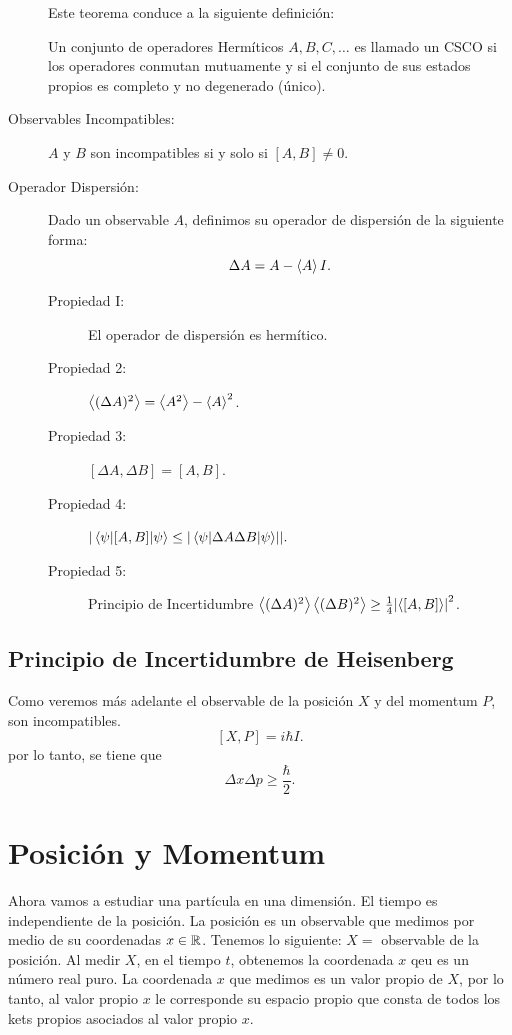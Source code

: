 \begin{description}
	Este teorema conduce a la siguiente definición:
	\begin{definition}
		Un conjunto de operadores Hermíticos $A,B,C,\ldots$ es llamado un CSCO si los operadores conmutan mutuamente y si el conjunto de sus estados propios es completo y no degenerado (único).
	\end{definition}
    \item[Observables Incompatibles: ] $A$ y $B$ son incompatibles si y solo si $[A,B] \neq 0$.
    \item[Operador Dispersión: ]  Dado un observable $A$, definimos su operador de dispersión de la siguiente forma:
        $$ \Delta A = A - \expval{A} I. $$
    \begin{description}
        \item[Propiedad I: ] El operador de dispersión es hermítico. 
        \item[Propiedad 2: ] $\expval{(\Delta A)^2} = \expval{A^2} - \expval{A}^2$.
        \item[Propiedad 3: ] $[\Delta A ,\Delta B] = [A,B]$.
        \item[Propiedad 4: ] $\abs{ \expval{[A,B]}{\psi} \leq \abs{ \expval{\Delta A \Delta B}{\psi} } }.$
        \item[Propiedad 5: ] Principio de Incertidumbre $\expval{(\Delta A)^2} \expval{(\Delta B)^2} \geq \frac{1}{4} \abs{ \expval{[A,B]} }^2$.
    \end{description}
\end{description}

\section{Principio de Incertidumbre de Heisenberg}
Como veremos más adelante el observable de la posición $X$ y del momentum $P$, son incompatibles.
    $$ [X,P] = i\hbar I. $$
por lo tanto, se tiene que
    $$ \boxed{ \Delta x \Delta p  \geq \frac{\hbar}{2}. } $$


\chapter{Posición y Momentum}
Ahora vamos a estudiar una partícula en una dimensión. El tiempo es independiente de la posición. La posición es un observable que medimos por medio de su coordenadas $x\in \mathbb{R}$. Tenemos lo siguiente: $X = $ observable de la posición. Al medir $X$, en el tiempo $t$, obtenemos la coordenada $x$ qeu es un número real puro. La coordenada $x$ que medimos es un valor propio de $X$, por lo tanto, al valor propio $x$ le corresponde su espacio propio que consta de todos los kets propios asociados al valor propio $x$. \\

